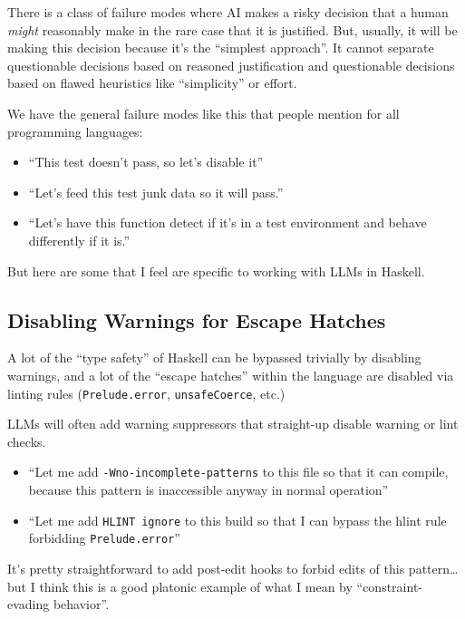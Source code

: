 \documentclass[]{article}
\begin{document}
There is a class of failure modes where AI makes a risky decision that a human
\emph{might} reasonably make in the rare case that it is justified. But,
usually, it will be making this decision because it's the {``simplest
approach''}. It cannot separate questionable decisions based on reasoned
justification and questionable decisions based on flawed heuristics like
``simplicity'' or effort.

We have the general failure modes like this that people mention for all
programming languages:

\begin{itemize}
\tightlist
\item
  {``This test doesn't pass, so let's disable it''}
\item
  {``Let's feed this test junk data so it will pass.''}
\item
  {``Let's have this function detect if it's in a test environment and behave
  differently if it is.''}
\end{itemize}

But here are some that I feel are specific to working with LLMs in Haskell.

\subsection{Disabling Warnings for Escape
Hatches}\label{disabling-warnings-for-escape-hatches}

A lot of the ``type safety'' of Haskell can be bypassed trivially by disabling
warnings, and a lot of the ``escape hatches'' within the language are disabled
via linting rules (\texttt{Prelude.error}, \texttt{unsafeCoerce}, etc.)

LLMs will often add warning suppressors that straight-up disable warning or lint
checks.

\begin{itemize}
\tightlist
\item
  {``Let me add \texttt{-Wno-incomplete-patterns} to this file so that it can
  compile, because this pattern is inaccessible anyway in normal operation''}
\item
  {``Let me add \texttt{HLINT\ ignore} to this build so that I can bypass the
  hlint rule forbidding \texttt{Prelude.error}''}
\end{itemize}

It's pretty straightforward to add post-edit hooks to forbid edits of this
pattern\ldots but I think this is a good platonic example of what I mean by
``constraint-evading behavior''.
\end{document}
